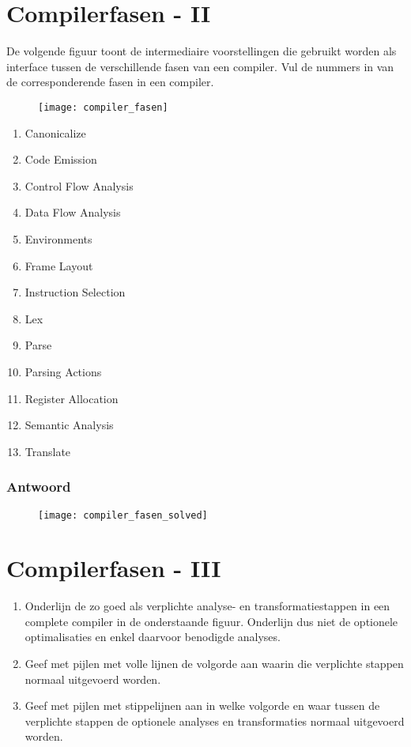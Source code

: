 \documentclass{report}
\newcommand{\answer}[1]{
		\subsubsection*{Antwoord}
			#1
}
\begin{document}
	\newpage
	\section{Compilerfasen - II}
	
	De volgende figuur toont de intermediaire voorstellingen die gebruikt worden als interface tussen de verschillende fasen van een compiler. Vul de nummers in van de corresponderende fasen in een compiler.
	\begin{figure}[ht]
		\texttt{[image: compiler\_fasen]}
	\end{figure}
	\begin{enumerate}
		\item Canonicalize
		\item Code Emission
		\item Control Flow Analysis
		\item Data Flow Analysis
		\item Environments
		\item Frame Layout
		\item Instruction Selection
		\item Lex
		\item Parse
		\item Parsing Actions
		\item Register Allocation
		\item Semantic Analysis
		\item Translate
	\end{enumerate}
	\answer{
		\begin{figure}[ht]
			\texttt{[image: compiler\_fasen\_solved]}
		\end{figure}
	}

	\newpage
	\section{Compilerfasen - III}
	\begin{enumerate}
		\item Onderlijn de zo goed als verplichte analyse- en transformatiestappen in een complete compiler in de onderstaande figuur. Onderlijn dus niet de optionele optimalisaties en enkel daarvoor benodigde analyses.
		\item Geef met pijlen met volle lijnen de volgorde aan waarin die verplichte stappen normaal uitgevoerd worden.
		\item Geef met pijlen met stippelijnen aan in welke volgorde en waar tussen de verplichte stappen de optionele analyses en transformaties normaal uitgevoerd worden.
	\end{enumerate}
\end{document}
